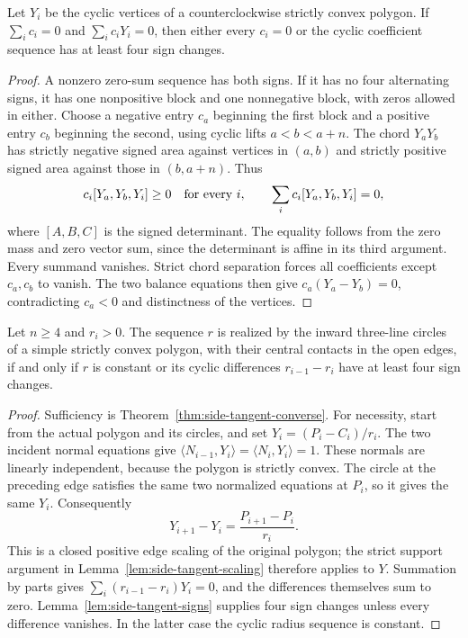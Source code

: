\begin{lemma}\label{lem:side-tangent-signs}
Let $Y_i$ be the cyclic vertices of a counterclockwise strictly convex polygon. If
$\sum_i c_i=0$ and $\sum_i c_iY_i=0$, then either every $c_i=0$ or the cyclic
coefficient sequence has at least four sign changes.
\end{lemma}

\begin{proof}
A nonzero zero-sum sequence has both signs. If it has no four alternating
signs, it has one nonpositive block and one nonnegative block, with zeros
allowed in either. Choose a negative entry $c_a$ beginning the first block
and a positive entry $c_b$ beginning the second, using cyclic lifts
$a<b<a+n$. The chord $Y_aY_b$ has strictly negative signed area against
vertices in $(a,b)$ and strictly positive signed area against those in
$(b,a+n)$. Thus
\[
 c_i[Y_a,Y_b,Y_i]\ge0\quad\hbox{for every }i,
 \qquad \sum_i c_i[Y_a,Y_b,Y_i]=0,
\]
where $[A,B,C]$ is the signed determinant. The equality follows from the
zero mass and zero vector sum, since the determinant is affine in its third
argument. Every summand vanishes. Strict chord separation forces all
coefficients except $c_a,c_b$ to vanish. The two balance equations then give
$c_a(Y_a-Y_b)=0$, contradicting $c_a<0$ and distinctness of the vertices.
\end{proof}

\begin{corollary}\label{cor:side-tangent-iff}
Let $n\ge4$ and $r_i>0$. The sequence $r$ is realized by the inward
three-line circles of a simple strictly convex polygon, with their central
contacts in the open edges, if and only if $r$ is constant or its cyclic
differences $r_{i-1}-r_i$ have at least four sign changes.
\end{corollary}

\begin{proof}
Sufficiency is Theorem~\ref{thm:side-tangent-converse}. For necessity, start
from the actual polygon and its circles, and set
$Y_i=(P_i-C_i)/r_i$. The two incident normal equations give
$\langle N_{i-1},Y_i\rangle=\langle N_i,Y_i\rangle=1$.
These normals are linearly independent, because the polygon is strictly
convex. The circle at the preceding edge satisfies the same two normalized
equations at $P_i$, so it gives the same $Y_i$. Consequently
\[
 Y_{i+1}-Y_i=\frac{P_{i+1}-P_i}{r_i}.
\]
This is a closed positive edge scaling of the original polygon; the strict
support argument in Lemma~\ref{lem:side-tangent-scaling} therefore applies to
$Y$. Summation by parts gives
$\sum_i(r_{i-1}-r_i)Y_i=0$, and the differences themselves sum to zero.
Lemma~\ref{lem:side-tangent-signs} supplies four sign changes unless every
difference vanishes. In the latter case the cyclic radius sequence is constant.
\end{proof}
